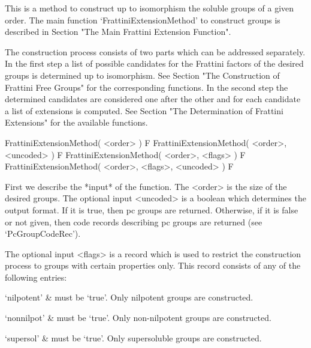 


This is a method to construct up to isomorphism the soluble groups 
of a given order. The main function `FrattiniExtensionMethod' to 
construct groups is described in Section "The Main Frattini Extension 
Function". 

The construction process consists of two parts which can be addressed
separately. In the first step a list of possible candidates for the
Frattini factors of the desired groups is determined up to isomorphism.
See Section "The Construction of Frattini Free Groups" for the 
corresponding functions. In the second step the determined candidates
are considered one after the other and for each candidate a list of
extensions is computed. See Section "The Determination of Frattini 
Extensions" for the available functions.



\> FrattiniExtensionMethod( <order> ) F
\> FrattiniExtensionMethod( <order>, <uncoded> ) F
\> FrattiniExtensionMethod( <order>, <flags> ) F
\> FrattiniExtensionMethod( <order>, <flags>, <uncoded> ) F

First we describe the *input* of the function. The <order> is the
size of the desired groups. The optional input <uncoded> is a 
boolean which determines the output format. If it is true, then 
pc groups are returned. Otherwise, if it is false or not given,
then code records describing pc groups are returned (see
`PcGroupCodeRec').

The optional input <flags> is a record which is used to restrict 
the construction process to groups with certain properties only. 
This record consists of any of the following
entries:

\beginitems
 `nilpotent' & 
      must be `true'. Only nilpotent groups are constructed.

 `nonnilpot' & 
      must be `true'. Only non-nilpotent groups are constructed.

 `supersol' & 
      must be `true'. Only supersoluble groups are constructed.

